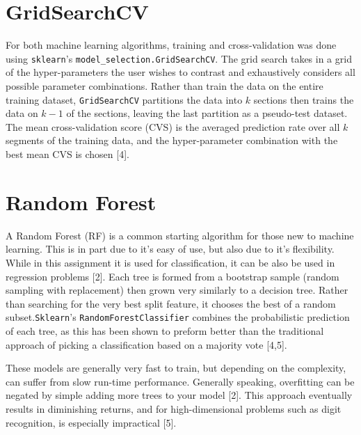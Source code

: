 \documentclass{article}
\begin{document}
\section{GridSearchCV}
For both machine learning algorithms, training and cross-validation was done using \verb+sklearn+'s \verb+model_selection.GridSearchCV+. The grid search takes in a grid of the hyper-parameters the user wishes to contrast and exhaustively considers all possible parameter combinations. Rather than train the data on the entire training dataset, \verb+GridSearchCV+ partitions the data into $k$ sections then trains the data on $k-1$ of the sections, leaving the last partition as a pseudo-test dataset. The mean cross-validation score (CVS) is the averaged prediction rate over all $k$ segments of the training data, and the hyper-parameter combination with the best mean CVS is chosen [4]. 

\section{Random Forest}
A Random Forest (RF) is a common starting algorithm for those new to machine learning. This is in part due to it's easy of use, but also due to it's flexibility. While in this assignment it is used for classification, it can be also be used in regression problems [2]. Each tree is formed from a bootstrap sample (random sampling with replacement) then grown very similarly to a decision tree. Rather than searching for the very best split feature, it chooses the best of a random subset.\verb+Sklearn+'s \verb+RandomForestClassifier+ combines the probabilistic prediction of each tree, as this has been shown to preform better than the traditional approach of picking a classification based on a majority vote [4,5].

These models are generally very fast to train, but depending on the complexity, can suffer from slow run-time performance. Generally speaking, overfitting can be negated by simple adding more trees to your model [2]. This approach eventually results in diminishing returns, and for high-dimensional problems such as digit recognition, is especially impractical [5].
\end{document}
